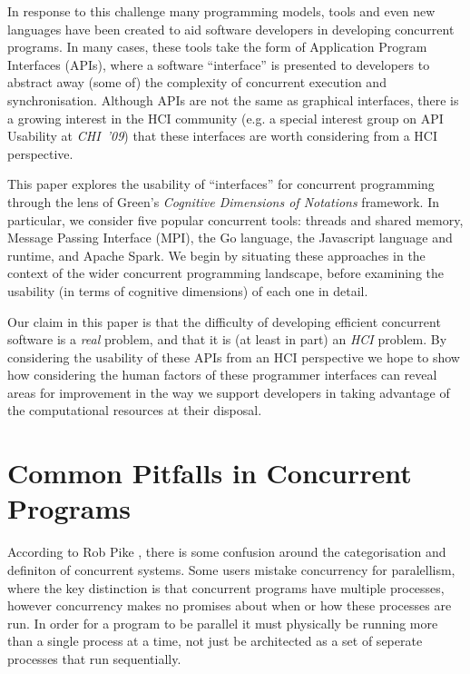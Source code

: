 \documentclass{sig-alternate}
\begin{document}
In response to this challenge many programming models, tools and even new languages have been created to aid software developers in developing concurrent programs. In many cases, these tools take the form of Application Program Interfaces (APIs), where a software ``interface'' is presented to developers to abstract away (some of) the complexity of concurrent execution and synchronisation. Although APIs are not the same as graphical interfaces, there is a growing interest in the HCI community (e.g. a special interest group on API Usability at \emph{CHI~'09}\cite{daughtry_api_2009}) that these interfaces are worth considering from a HCI perspective.

This paper explores the usability of ``interfaces'' for concurrent programming through the lens of Green's \emph{Cognitive Dimensions of  Notations} framework\cite{green89:_cognit_dimen_notat}. In particular, we consider five popular concurrent tools: threads and shared memory, Message Passing Interface (MPI), the Go language, the Javascript language and runtime, and Apache Spark.  We begin by situating these approaches in the context of the wider concurrent programming landscape, before examining the usability (in terms of cognitive dimensions) of each one in detail.

Our claim in this paper is that the difficulty of developing efficient
concurrent software is a \emph{real} problem, and that it is (at least
in part) an \emph{HCI} problem. By considering the usability of these
APIs from an HCI perspective we hope to show how considering the human
factors of these programmer interfaces can reveal areas for
improvement in the way we support developers in taking advantage of
the computational resources at their disposal.

\section{Common Pitfalls in Concurrent Programs}

According to Rob Pike \cite{pike13:_concur_paral}, there is some
confusion around the categorisation and definiton of concurrent
systems. Some users mistake concurrency for paralellism, where the key
distinction is that concurrent programs have multiple processes,
however concurrency makes no promises about when or how these
processes are run. In order for a program to be parallel it must
physically be running more than a single process at a time, not just
be architected as a set of seperate processes that run sequentially.
\end{document}
